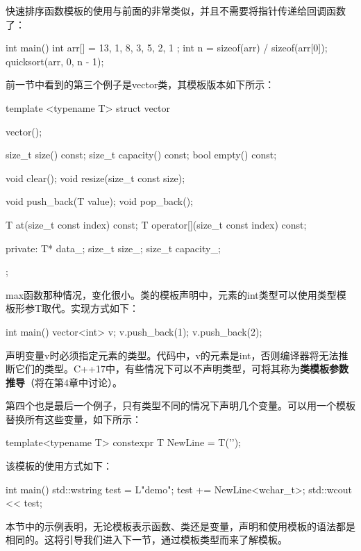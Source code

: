 快速排序函数模板的使用与前面的非常类似，并且不需要将指针传递给回调函数了：

\begin{cpp}
int main()
{
	int arr[] = { 13, 1, 8, 3, 5, 2, 1 };
	int n = sizeof(arr) / sizeof(arr[0]);
	quicksort(arr, 0, n - 1);
}
\end{cpp}

前一节中看到的第三个例子是vector类，其模板版本如下所示：

\begin{cpp}
template <typename T>
struct vector
{
	vector();
	
	size_t size() const;
	size_t capacity() const;
	bool empty() const;
	
	void clear();
	void resize(size_t const size);
	
	void push_back(T value);
	void pop_back();
	
	T at(size_t const index) const;
	T operator[](size_t const index) const;
	
private:
	T* data_;
	size_t size_;
	size_t capacity_;
};
\end{cpp}

max函数那种情况，变化很小。类的模板声明中，元素的int类型可以使用类型模板形参T取代。实现方式如下：

\begin{cpp}
int main()
{
	vector<int> v;
	v.push_back(1);
	v.push_back(2);
}
\end{cpp}

声明变量v时必须指定元素的类型。代码中，v的元素是int，否则编译器将无法推断它们的类型。C++17中，有些情况下可以不声明类型，可将其称为\textbf{类模板参数推导}（将在第4章中讨论）。

第四个也是最后一个例子，只有类型不同的情况下声明几个变量。可以用一个模板替换所有这些变量，如下所示：

\begin{cpp}
template<typename T>
constexpr T NewLine = T('\n');
\end{cpp}

该模板的使用方式如下：

\begin{cpp}
int main()
{
	std::wstring test = L"demo";
	test += NewLine<wchar_t>;
	std::wcout << test;
}
\end{cpp}

本节中的示例表明，无论模板表示函数、类还是变量，声明和使用模板的语法都是相同的。这将引导我们进入下一节，通过模板类型而来了解模板。














